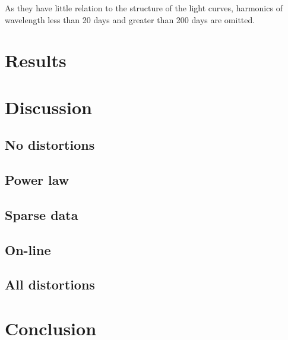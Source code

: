 	As they have little relation to the structure of the light curves, harmonics of wavelength less than 20 days and greater than 200 days are omitted.
	
	\section{Results}
	
	\section{Discussion}
	\subsection{No distortions}
	\subsection{Power law}
	\subsection{Sparse data}
	\subsection{On-line}
	\subsection{All distortions}

	\section{Conclusion}
	
		
